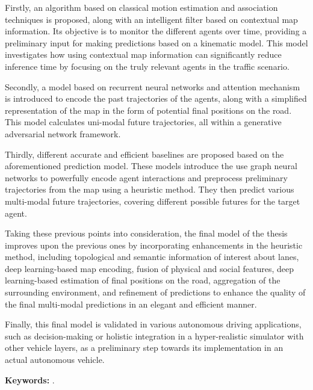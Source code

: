 Firstly, an algorithm based on classical motion estimation and association techniques is proposed, along with an intelligent filter based on contextual map information. Its objective is to monitor the different agents over time, providing a preliminary input for making predictions based on a kinematic model. This model investigates how using contextual map information can significantly reduce inference time by focusing on the truly relevant agents in the traffic scenario.

Secondly, a model based on recurrent neural networks and attention mechanism is introduced to encode the past trajectories of the agents, along with a simplified representation of the map in the form of potential final positions on the road. This model calculates uni-modal future trajectories, all within a generative adversarial network framework.

Thirdly, different accurate and efficient baselines are proposed based on the aforementioned prediction model. These models introduce the use graph neural networks to powerfully encode agent interactions and preprocess preliminary trajectories from the map using a heuristic method. They then predict various multi-modal future trajectories, covering different possible futures for the target agent.

Taking these previous points into consideration, the final model of the thesis improves upon the previous ones by incorporating enhancements in the heuristic method, including topological and semantic information of interest about lanes, deep learning-based map encoding, fusion of physical and social features, deep learning-based estimation of final positions on the road, aggregation of the surrounding environment, and refinement of predictions to enhance the quality of the final multi-modal predictions in an elegant and efficient manner.

Finally, this final model is validated in various autonomous driving applications, such as decision-making or holistic integration in a hyper-realistic simulator with other vehicle layers, as a preliminary step towards its implementation in an actual autonomous vehicle.

\textbf{Keywords:} \myThesisKeywordsEnglish.



